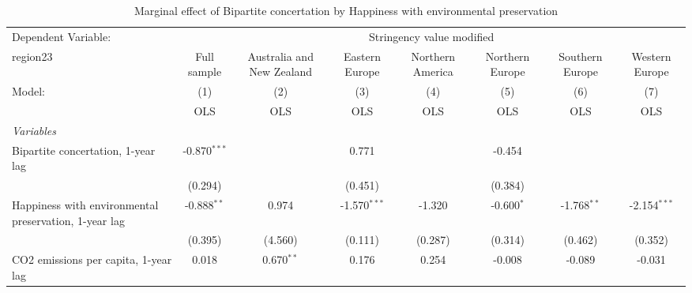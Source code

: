 
\begin{table}[htbp]
   \caption{Marginal effect of Bipartite concertation by Happiness with environmental preservation}
   \centering
   \begin{tabular}{lccccccc}
      \toprule
      Dependent Variable: & \multicolumn{7}{c}{Stringency value modified}\\
      region23                                                                                   & Full sample    & Australia and New Zealand & Eastern Europe & Northern America & Northern Europe & Southern Europe & Western Europe \\   
      Model:                                                                                     & (1)            & (2)                       & (3)            & (4)              & (5)             & (6)             & (7)\\  
                                                                                                 &  OLS           & OLS                       & OLS            & OLS              & OLS             & OLS             & OLS\\  
      \midrule
      \emph{Variables}\\
      Bipartite concertation, 1-year lag                                                         & -0.870$^{***}$ &                           & 0.771          &                  & -0.454          &                 &   \\   
                                                                                                 & (0.294)        &                           & (0.451)        &                  & (0.384)         &                 &   \\   
      Happiness with environmental preservation, 1-year lag                                      & -0.888$^{**}$  & 0.974                     & -1.570$^{***}$ & -1.320           & -0.600$^{*}$    & -1.768$^{**}$   & -2.154$^{***}$\\   
                                                                                                 & (0.395)        & (4.560)                   & (0.111)        & (0.287)          & (0.314)         & (0.462)         & (0.352)\\   
      CO2 emissions per capita, 1-year lag                                                       & 0.018          & 0.670$^{**}$              & 0.176          & 0.254            & -0.008          & -0.089          & -0.031\\   

\end{tabular}
\end{table}
